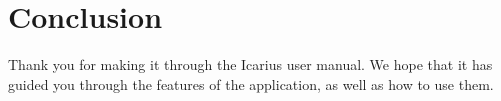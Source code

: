 \section{Conclusion}
Thank you for making it through the Icarius user manual. We hope that it has guided you through the features of the application, as well as how to use them.